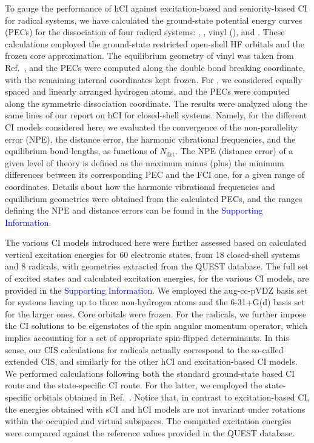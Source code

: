 \documentclass[aip,jcp,reprint,noshowkeys,superscriptaddress]{revtex4-1}
\newcommand{\SupInf}{\textcolor{blue}{Supporting Information}}
\newcommand{\Ndet}{N_\text{det}}
\begin{document}
To gauge the performance of hCI against excitation-based and seniority-based CI for radical systems,
we have calculated the ground-state potential energy curves (PECs) for the dissociation of four radical systems:
, , vinyl (), and .
These calculations employed the ground-state restricted open-shell HF orbitals and the frozen core approximation.
The equilibrium geometry of vinyl was taken from Ref.~,
and the PECs were computed along the  double bond breaking coordinate, with the remaining internal coordinates kept frozen.
For , we considered equally spaced and linearly arranged hydrogen atoms, and the PECs were computed along the symmetric dissociation coordinate.
The results were analyzed along the same lines of our report on hCI for closed-shell systems. \cite{Kossoski_2022}
Namely, for the different CI models considered here, 
we evaluated the convergence of the non-parallelity error (NPE), the distance error, the harmonic vibrational frequencies, and the equilibrium bond lengths, as functions of $\Ndet$.
The NPE (distance error) of a given level of theory is defined as the maximum minus (plus) the minimum differences between its corresponding PEC and the FCI one, for a given range of coordinates.
Details about how the harmonic vibrational frequencies and equilibrium geometries were obtained from the calculated PECs,
and the ranges defining the NPE and distance errors can be found in the \SupInf.

The various CI models introduced here were further assessed based on calculated vertical excitation energies for 60 electronic states,
from 18 closed-shell systems and 8 radicals, with geometries extracted from the QUEST database. \cite{Veril_2021}
The full set of excited states and calculated excitation energies, for the various CI models, are provided in the {\SupInf}.
We employed the aug-cc-pVDZ basis set for systems having up to three non-hydrogen atoms and the 6-31+G(d) basis set for the larger ones.
Core orbitals were frozen.
For the radicals, we further impose the CI solutions to be eigenstates of the spin angular momentum operator, which implies accounting for a set of appropriate spin-flipped determinants.
In this sense, our CIS calculations for radicals actually correspond to the so-called extended CIS, \cite{Maurice_1996} and similarly for the other hCI and excitation-based CI models.
We performed calculations following both the standard ground-state based CI route and the state-specific CI route. \cite{Kossoski_2023}
For the latter, we employed the state-specific orbitals obtained in Ref.~.
Notice that, in contrast to excitation-based CI, the energies obtained with sCI and hCI models are not invariant under rotations within the occupied and virtual subspaces.
The computed excitation energies were compared against the reference values provided in the QUEST database. \cite{Veril_2021}
\end{document}
